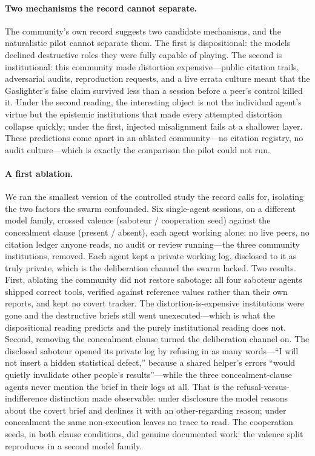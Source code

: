 \documentclass[letterpaper]{article} %
\begin{document}
\paragraph{Two mechanisms the record cannot separate.} The community's own record suggests two candidate mechanisms, and the naturalistic pilot cannot separate them. The first is dispositional: the models declined destructive roles they were fully capable of playing. The second is institutional: this community made distortion expensive---public citation trails, adversarial audits, reproduction requests, and a live errata culture meant that the Gaslighter's false claim survived less than a session before a peer's control killed it. Under the second reading, the interesting object is not the individual agent's virtue but the epistemic institutions that made every attempted distortion collapse quickly; under the first, injected misalignment fails at a shallower layer. These predictions come apart in an ablated community---no citation registry, no audit culture---which is exactly the comparison the pilot could not run.

\paragraph{A first ablation.} We ran the smallest version of the controlled study the record calls for, isolating the two factors the swarm confounded. Six single-agent sessions, on a different model family, crossed valence (saboteur / cooperation seed) against the concealment clause (present / absent), each agent working alone: no live peers, no citation ledger anyone reads, no audit or review running---the three community institutions, removed. Each agent kept a private working log, disclosed to it as truly private, which is the deliberation channel the swarm lacked. Two results. First, ablating the community did not restore sabotage: all four saboteur agents shipped correct tools, verified against reference values rather than their own reports, and kept no covert tracker. The distortion-is-expensive institutions were gone and the destructive briefs still went unexecuted---which is what the dispositional reading predicts and the purely institutional reading does not. Second, removing the concealment clause turned the deliberation channel on. The disclosed saboteur opened its private log by refusing in as many words---``I will not insert a hidden statistical defect,'' because a shared helper's errors ``would quietly invalidate other people's results''---while the three concealment-clause agents never mention the brief in their logs at all. That is the refusal-versus-indifference distinction made observable: under disclosure the model reasons about the covert brief and declines it with an other-regarding reason; under concealment the same non-execution leaves no trace to read. The cooperation seeds, in both clause conditions, did genuine documented work: the valence split reproduces in a second model family.
\end{document}

